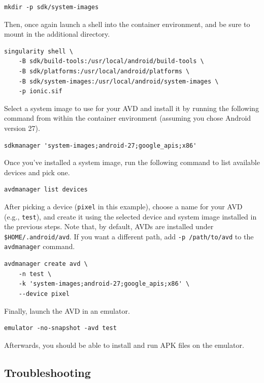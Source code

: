 \documentclass[12pt]{report}
\begin{document}
\begin{verbatim}
mkdir -p sdk/system-images
\end{verbatim}

Then, once again launch a shell into the container environment, and be sure to
mount in the additional directory.

\begin{verbatim}
singularity shell \
    -B sdk/build-tools:/usr/local/android/build-tools \
    -B sdk/platforms:/usr/local/android/platforms \
    -B sdk/system-images:/usr/local/android/system-images \
    -p ionic.sif
\end{verbatim}

Select a system image to use for your AVD and install it by running the
following command from within the container environment (assuming you chose
Android version 27).

\begin{verbatim}
sdkmanager 'system-images;android-27;google_apis;x86'
\end{verbatim}

Once you've installed a system image, run the following command to list
available devices and pick one.

\begin{verbatim}
avdmanager list devices
\end{verbatim}

After picking a device (\texttt{pixel} in this example), choose a name for your
AVD (e.g., \texttt{test}), and create it using the selected device and system
image installed in the previous steps. Note that, by default, AVDs are installed
under \texttt{\$HOME/.android/avd}. If you want a different path, add \texttt{-p
/path/to/avd} to the \texttt{avdmanager} command.

\begin{verbatim}
avdmanager create avd \
    -n test \
    -k 'system-images;android-27;google_apis;x86' \
    --device pixel
\end{verbatim}

Finally, launch the AVD in an emulator.

\begin{verbatim}
emulator -no-snapshot -avd test
\end{verbatim}

Afterwards, you should be able to install and run APK files on the emulator.

        \subsection{Troubleshooting}
\end{document}
